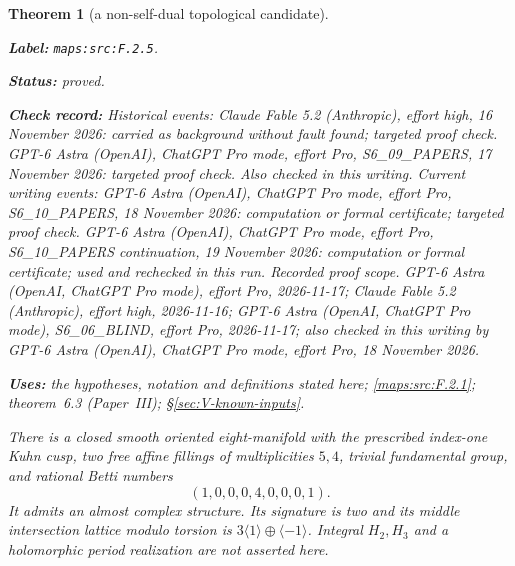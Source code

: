 \documentclass[11pt,a4paper]{article}
\newtheorem{theorem}{Theorem}[section]
\theoremstyle{definition}
\newcommand{\StatementRecord}[4]{\par\smallskip\begingroup\upshape\raggedright\noindent\textbf{Label:} \nolinkurl{#1}.\par\noindent\textbf{Status:} #2.\par\noindent\textbf{Check record:} #3.\par\noindent\textbf{Uses:} #4.\par\endgroup\smallskip}
\newcommand{\ExternalPaperRef}[3]{\ifmmode\text{\upshape #1#2 (Paper~#3)}\else #1#2 (Paper~#3)\fi}
\begin{document}
\begin{theorem}[a non-self-dual topological candidate]\label{maps:src:F.2.5}
\StatementRecord{maps:src:F.2.5}{proved}{Historical events: Claude Fable 5.2 (Anthropic), effort high, 16 November 2026: carried as background without fault found; targeted proof check. GPT-6 Astra (OpenAI), ChatGPT Pro mode, effort Pro, S6\_09\_PAPERS, 17 November 2026: targeted proof check. Also checked in this writing. Current writing events: GPT-6 Astra (OpenAI), ChatGPT Pro mode, effort Pro, S6\_10\_PAPERS, 18 November 2026: computation or formal certificate; targeted proof check. GPT-6 Astra (OpenAI), ChatGPT Pro mode, effort Pro, S6\_10\_PAPERS continuation, 19 November 2026: computation or formal certificate; used and rechecked in this run. \emph{Recorded proof scope.} GPT-6 Astra (OpenAI, ChatGPT Pro mode), effort Pro, 2026-11-17; Claude Fable 5.2 (Anthropic), effort high, 2026-11-16; GPT-6 Astra (OpenAI, ChatGPT Pro mode), S6\_06\_BLIND, effort Pro, 2026-11-17; also checked in this writing by GPT-6 Astra (OpenAI), ChatGPT Pro mode, effort Pro, 18 November 2026}{the hypotheses, notation and definitions stated here; \cref{maps:src:F.2.1}; \ExternalPaperRef{theorem~}{6.3}{III}; \S\ref{sec:V-known-inputs}}


There is a closed smooth oriented eight-manifold with the prescribed
index-one Kuhn cusp, two free affine fillings of multiplicities $5,4$,
trivial fundamental group, and rational Betti numbers
\[
 (1,0,0,0,4,0,0,0,1). \tag{F.5}\label{maps:eq:F.5}
\]
It admits an almost complex structure.  Its signature is two and
its middle intersection lattice modulo torsion is
$3\langle1\rangle\oplus\langle-1\rangle$.
Integral $H_2,H_3$ and a holomorphic period realization are not
asserted here.

\end{theorem}
\end{document}
